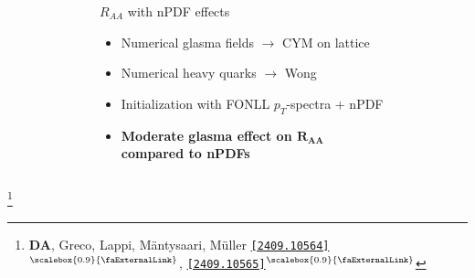 \documentclass[aspectratio=169,11pt,usenames,dvipsnames]{beamer}
\renewcommand{\thefootnote}{\color{customblue}\faPaperPlaneO}
\newcommand\blfootnote[1]{%
  \begingroup
  \renewcommand\thefootnote{}\footnote{#1}%
  \addtocounter{footnote}{-1}%
  \endgroup
}
\begin{document}
\begin{frame}[t,noframenumbering]
\begin{columns}[onlytextwidth,t]
\begin{figure}
        \end{figure}
        \begin{center}
            {\Large\color{isgold} $R_{AA}$ with nPDF effects \\[10pt]}
            \footnotesize
                \begin{itemize}
                    \item {\color{lightgray}Numerical glasma fields $\rightarrow$ CYM on lattice}
                    \item {\color{lightgray}Numerical heavy quarks $\rightarrow$ Wong}
                    \item {\color{lightgray}Initialization with FONLL $p_T$-spectra + nPDF}\\[15pt]
                    \item {\color{destacado}\bfseries\normalsize{Moderate glasma effect on $\boldsymbol{R_{AA}}$\\ compared to nPDFs}}
                \end{itemize}
        \end{center}
    \end{columns}
    \blfootnote{\scriptsize \textbf{DA}, Greco, Lappi, Mäntysaari, M\"{u}ller \href{https://arxiv.org/abs/2409.10564}{\color{palgold}\texttt{[2409.10564]}$^\text{\scalebox{0.9}{\faExternalLink}}$}, \href{https://arxiv.org/abs/2409.10565}{\color{palgold}\texttt{[2409.10565]}$^\text{\scalebox{0.9}{\faExternalLink}}$}}
\end{frame}



\end{document}
